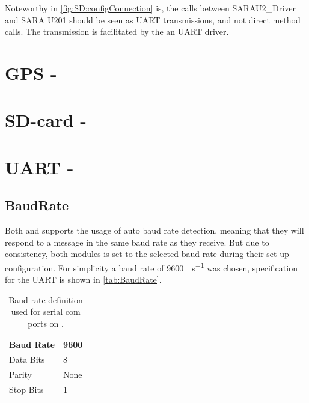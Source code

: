 Noteworthy in \cref{fig:SD:configConnection} is, the calls between SARAU2_Driver and SARA U201 should be seen as UART transmissions, and not direct method calls. The transmission is facilitated by the an UART driver. 

\section{GPS - \GPS}





\section{SD-card - \SDsock}


\section{UART - \SAMD}



\subsection{BaudRate}
Both \SARA and \GPS supports the usage of auto baud rate detection, meaning that they will respond to a message in the same baud rate as they receive.
But due to consistency, both modules is set to the selected baud rate during their set up configuration. 
For simplicity a baud rate of \SI[per-mode = symbol]{9600}{\bit\per\second} was chosen, specification for the UART is shown in \vref{tab:BaudRate}.

\begin{table}[H]
	\begin{tabular}{ll}
		\hline 
		Baud Rate & 9600 \\ 
		\hline 
		Data Bits & 8 \\ 
		\hline 
		Parity & None \\ 
		\hline 
		Stop Bits & 1 \\ 
		\hline 
	\end{tabular}
	\centering
	\caption{Baud rate definition used for serial com ports on \SAMD.}
	\label{tab:BaudRate}
\end{table} 

\FloatBarrier